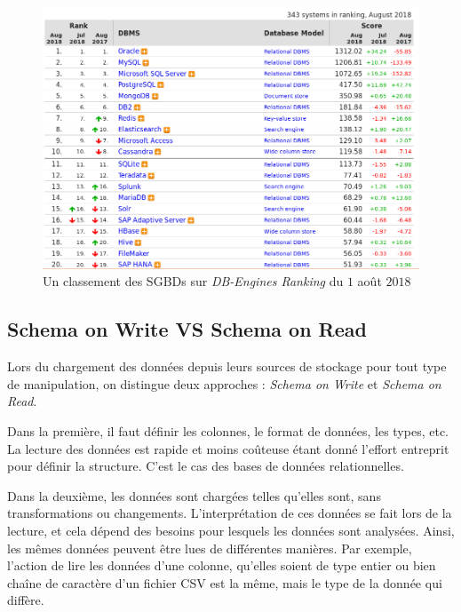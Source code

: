 		\begin{figure}[H]
			\centering
			\captionsetup{justification=centering}
			\includegraphics[width=1\linewidth]{illustrations/ranking-db}
			\caption{Un classement des SGBDs sur \textit{DB-Engines Ranking} du $1$ août $2018$ }
			\label{fig:ranking-db}
		\end{figure}
		
		
		
		\subsection{Schema on Write VS Schema on Read} \label{sec:schema-read-write}
		
		Lors du chargement des données depuis leurs sources de stockage pour tout type de manipulation, on distingue deux approches : \textit{ Schema on Write} et \textit{Schema on Read}.
		
		Dans la première, il faut définir les colonnes, le format de données, les types, etc. La lecture des données est rapide et moins coûteuse étant donné l'effort entreprit pour définir la structure. C'est le cas des bases de données relationnelles.
		
		Dans la deuxième, les données sont chargées telles qu'elles sont, sans transformations ou changements. L'interprétation de ces données se fait lors de la lecture, et cela dépend des besoins pour lesquels les données sont analysées. Ainsi, les mêmes données peuvent être lues de différentes manières. Par exemple, l'action  de lire les données  d'une colonne, qu'elles soient de type entier ou bien chaîne de caractère d'un fichier CSV est la même, mais le type de la donnée qui diffère.
		
